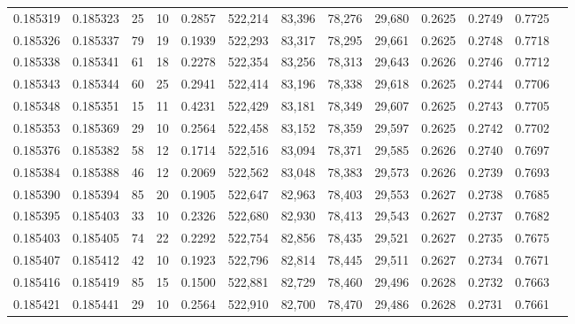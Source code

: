 \begin{tabular}{rrrrrrrrrrrrr}
0.185319 & 0.185323 &    25 &  10 &                                     0.2857 & 522,214 &  83,396 &  78,276 &  29,680 & 0.2625 & 0.2749 & 0.7725 \\
0.185326 & 0.185337 &    79 &  19 &                                     0.1939 & 522,293 &  83,317 &  78,295 &  29,661 & 0.2625 & 0.2748 & 0.7718 \\
0.185338 & 0.185341 &    61 &  18 &                                     0.2278 & 522,354 &  83,256 &  78,313 &  29,643 & 0.2626 & 0.2746 & 0.7712 \\
0.185343 & 0.185344 &    60 &  25 &                                     0.2941 & 522,414 &  83,196 &  78,338 &  29,618 & 0.2625 & 0.2744 & 0.7706 \\
0.185348 & 0.185351 &    15 &  11 &                                     0.4231 & 522,429 &  83,181 &  78,349 &  29,607 & 0.2625 & 0.2743 & 0.7705 \\
0.185353 & 0.185369 &    29 &  10 &                                     0.2564 & 522,458 &  83,152 &  78,359 &  29,597 & 0.2625 & 0.2742 & 0.7702 \\
0.185376 & 0.185382 &    58 &  12 &                                     0.1714 & 522,516 &  83,094 &  78,371 &  29,585 & 0.2626 & 0.2740 & 0.7697 \\
0.185384 & 0.185388 &    46 &  12 &                                     0.2069 & 522,562 &  83,048 &  78,383 &  29,573 & 0.2626 & 0.2739 & 0.7693 \\
0.185390 & 0.185394 &    85 &  20 &                                     0.1905 & 522,647 &  82,963 &  78,403 &  29,553 & 0.2627 & 0.2738 & 0.7685 \\
0.185395 & 0.185403 &    33 &  10 &                                     0.2326 & 522,680 &  82,930 &  78,413 &  29,543 & 0.2627 & 0.2737 & 0.7682 \\
0.185403 & 0.185405 &    74 &  22 &                                     0.2292 & 522,754 &  82,856 &  78,435 &  29,521 & 0.2627 & 0.2735 & 0.7675 \\
0.185407 & 0.185412 &    42 &  10 &                                     0.1923 & 522,796 &  82,814 &  78,445 &  29,511 & 0.2627 & 0.2734 & 0.7671 \\
0.185416 & 0.185419 &    85 &  15 &                                     0.1500 & 522,881 &  82,729 &  78,460 &  29,496 & 0.2628 & 0.2732 & 0.7663 \\
0.185421 & 0.185441 &    29 &  10 &                                     0.2564 & 522,910 &  82,700 &  78,470 &  29,486 & 0.2628 & 0.2731 & 0.7661 \\

\end{tabular}
